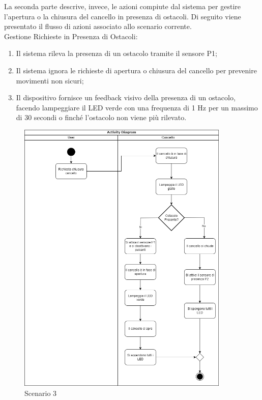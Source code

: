 La seconda parte descrive, invece, le azioni compiute dal sistema per gestire l'apertura o la chiusura del cancello in presenza di ostacoli.
Di seguito viene presentato il flusso di azioni associato allo scenario corrente. \\

\noindent Gestione Richieste in Presenza di Ostacoli:

\begin{enumerate}
    \item Il sistema rileva la presenza di un ostacolo tramite il sensore P1;
    
    \item Il sistema ignora le richieste di apertura o chiusura del cancello per prevenire movimenti non sicuri;
    
    \item Il dispositivo fornisce un feedback visivo della presenza di un ostacolo, facendo lampeggiare il LED verde con una frequenza di 1 Hz per un massimo di 30 secondi o finché l'ostacolo non viene più rilevato.
\end{enumerate}

\begin{figure}[H]
    \centering
    \includegraphics[width=0.9\textwidth]{figures/scenario3.png}
    \caption{Scenario 3}
    \label{scenario3}
\end{figure}



